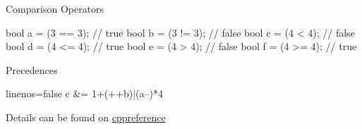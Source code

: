 \begin{frame}[fragile]
  \begin{block}{Comparison Operators}
    \begin{cppcode*}{}
      bool a = (3 == 3);  // true
      bool b = (3 != 3);  // false
      bool c = (4 <  4);  // false
      bool d = (4 <= 4);  // true
      bool e = (4 >  4);  // false
      bool f = (4 >= 4);  // true
    \end{cppcode*}
  \end{block}
  \pause
  \begin{block}{Precedences }
    \begin{cppcode*}{linenos=false}
      c &= 1+(++b)|(a--)*4%
    \end{cppcode*}
    Details can be found on {\color{blue!50!white} \href{https://en.cppreference.com/w/cpp/language/operator_precedence}{cppreference}}
  \end{block}
\end{frame}
